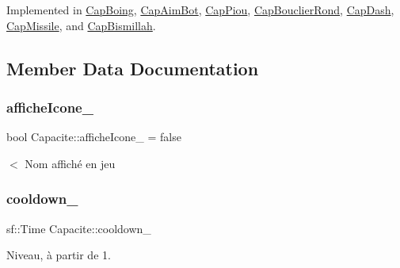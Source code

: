 Implemented in \mbox{\hyperlink{class_cap_boing_a879dfeba930a0be60873ef3403a35eb1}{Cap\+Boing}}, \mbox{\hyperlink{class_cap_aim_bot_ad94e41d0b328576b74e802935450c0ad}{Cap\+Aim\+Bot}}, \mbox{\hyperlink{class_cap_piou_a8833dd4c07fac882bcbad2698fdcd8c4}{Cap\+Piou}}, \mbox{\hyperlink{class_cap_bouclier_rond_ae420337d3d5c5ec2e5a4a0cafa8f69ad}{Cap\+Bouclier\+Rond}}, \mbox{\hyperlink{class_cap_dash_aa7c16bdf13761c0bf761bd417cffdcc9}{Cap\+Dash}}, \mbox{\hyperlink{class_cap_missile_a8972a92894ca15903563ec41bc63c6ef}{Cap\+Missile}}, and \mbox{\hyperlink{class_cap_bismillah_afc32f552a327af6f5759363d460f2eb7}{Cap\+Bismillah}}.



\subsection{Member Data Documentation}
\mbox{\label{class_capacite_a5d4f1d24e9ecfbfacc0bafc5ae508f2c}} 
\subsubsection{\texorpdfstring{affiche\+Icone\+\_\+}{afficheIcone\_}}
{\footnotesize\ttfamily bool Capacite\+::affiche\+Icone\+\_\+ = false\hspace{0.3cm}{\ttfamily [protected]}}



$<$ Nom affiché en jeu 

\mbox{\label{class_capacite_a31264cab5a0e14cd05626727abb7fa83}} 
\subsubsection{\texorpdfstring{cooldown\+\_\+}{cooldown\_}}
{\footnotesize\ttfamily sf\+::\+Time Capacite\+::cooldown\+\_\+\hspace{0.3cm}{\ttfamily [protected]}}



Niveau, à partir de 1. 

\mbox{\label{class_capacite_a12c1527d4ab9b80bd9e2174d92d00639}} 
